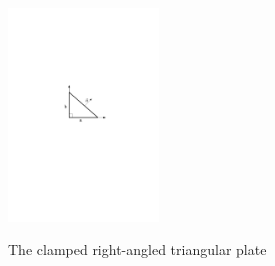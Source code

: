 \documentclass[a4paper]{article}      %
\begin{document}
\begin{figure}
  \centering
  \includegraphics[width=4cm]{triangularplate.pdf}\\
  \caption{The clamped right-angled triangular plate}\label{ref:figure:1}
\end{figure}
\end{document}
